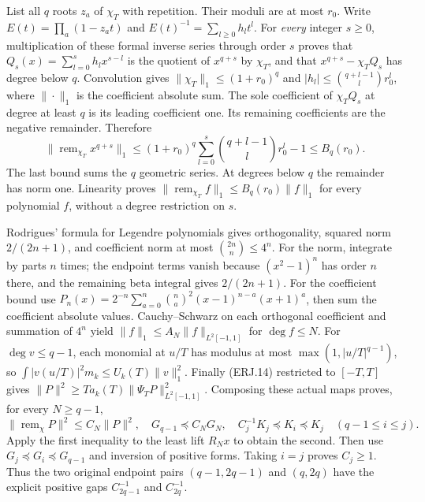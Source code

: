 List all $q$ roots $z_a$ of $\chi_T$ with repetition. Their moduli
are at most $r_0$. Write
$E(t)=\prod_a(1-z_at)$ and $E(t)^{-1}=\sum_{l\ge0}h_lt^l$.
For \emph{every} integer $s\ge0$, multiplication of these formal
inverse series through order $s$ proves that
$Q_s(x)=\sum_{l=0}^sh_lx^{s-l}$ is the quotient of $x^{q+s}$
by $\chi_T$, and that $x^{q+s}-\chi_TQ_s$ has degree below $q$.
Convolution gives $\|\chi_T\|_1\le(1+r_0)^q$ and
$|h_l|\le\binom{q+l-1}{l}r_0^l$, where $\|\cdot\|_1$
is the coefficient absolute sum. The sole coefficient of
$\chi_TQ_s$ at degree at least $q$ is its leading coefficient one.
Its remaining coefficients are the negative remainder. Therefore
\[
 \|\operatorname{rem}_{\chi_T}x^{q+s}\|_1
 \le(1+r_0)^q\sum_{l=0}^s\binom{q+l-1}{l}r_0^l-1
 \le B_q(r_0).\tag{ERJ.16}
\]
The last bound sums the $q$ geometric series. At degrees below $q$
the remainder has norm one. Linearity proves
$\|\operatorname{rem}_{\chi_T}f\|_1\le B_q(r_0)\|f\|_1$
for every polynomial $f$, without a degree restriction on $s$.

Rodrigues' formula for Legendre polynomials gives orthogonality,
squared norm $2/(2n+1)$, and coefficient norm at most
$\binom{2n}{n}\le4^n$. For the norm, integrate by parts $n$ times;
the endpoint terms vanish because $(x^2-1)^n$ has order $n$ there,
and the remaining beta integral gives $2/(2n+1)$. For the coefficient
bound use
$P_n(x)=2^{-n}\sum_{a=0}^n\binom na^2(x-1)^{n-a}(x+1)^a$,
then sum the coefficient absolute values. Cauchy--Schwarz on each
orthogonal coefficient and summation of $4^n$ yield
$\|f\|_1\le A_N\|f\|_{L^2[-1,1]}$ for $\deg f\le N$.
For $\deg v\le q-1$, each monomial at $u/T$ has modulus at most
$\max(1,|u/T|^{q-1})$, so
$\int|v(u/T)|^2m_k\le U_k(T)\|v\|_1^2$.
Finally (ERJ.14) restricted to $[-T,T]$ gives
$\|P\|^2\ge T a_k(T)\|\Psi_TP\|_{L^2[-1,1]}^2$.
Composing these actual maps proves, for every $N\ge q-1$,
\[
 \|\operatorname{rem}_\chi P\|^2\le C_N\|P\|^2,
 \quad G_{q-1}\preceq C_NG_N,
 \quad C_j^{-1}K_j\preceq K_i\preceq K_j
 \quad(q-1\le i\le j).\tag{ERJ.17}
\]
Apply the first inequality to the least lift $R_Nx$ to obtain the
second. Then use $G_j\preceq G_i\preceq G_{q-1}$ and inversion
of positive forms. Taking $i=j$ proves $C_j\ge1$.
Thus the two original endpoint pairs $(q-1,2q-1)$ and $(q,2q)$
have the explicit positive gaps $C_{2q-1}^{-1}$ and $C_{2q}^{-1}$.

